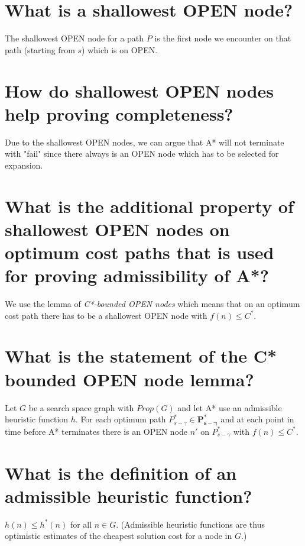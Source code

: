 \documentclass[12pt, a4paper]{article}
\begin{document}
\section{What is a shallowest OPEN node?}
The shallowest OPEN node for a path $P$ is the first node we encounter on that path (starting from $s$) which is on OPEN.

\section{How do shallowest OPEN nodes help proving completeness?}
Due to the shallowest OPEN nodes, we can argue that A* will not terminate with "fail" since there always is an OPEN node which has to be selected for expansion.

\section{What is the additional property of shallowest OPEN nodes on optimum cost paths that is used for proving admissibility of A*?}
We use the lemma of \textit{C*-bounded OPEN nodes} which means that on an optimum cost path there has to be a shallowest OPEN node with $f(n) \leq C^*$. 

\section{What is the statement of the C* bounded OPEN node lemma?}
Let $G$ be a search space graph with $Prop(G)$ and let A* use an admissible heuristic function $h$. For each optimum path $P^{*}_{s-\gamma} \in \boldsymbol{P^*_{s-\gamma}}$ and at each point in time before A* terminates there is an OPEN node $n'$ on $P^{*}_{s-\gamma}$ with $f(n) \leq C^*$. 

\section{What is the definition of an admissible heuristic function?}
$h(n) \leq h^*(n)$ for all $n \in G$. (Admissible heuristic functions are thus optimistic estimates of the cheapest solution cost for a node in $G$.)
\end{document}
